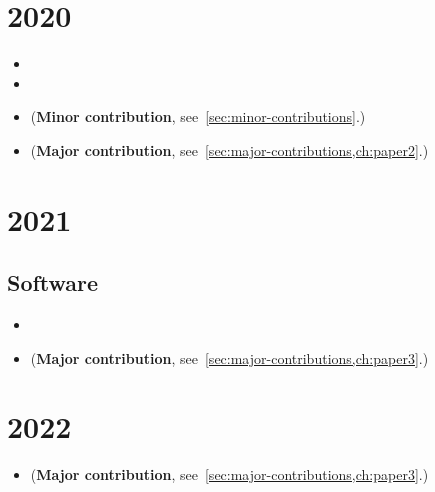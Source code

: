 \section*{2020}
\begin{itemize}
	\item {}
	\item {}
	\item {} (\textbf{Minor contribution}, see~\cref{sec:minor-contributions}.)
	\item {} (\textbf{Major contribution}, see~\cref{sec:major-contributions,ch:paper2}.)
\end{itemize}

\section*{2021}
\subsection*{Software}
\begin{itemize}
	\item {}
	\item {} (\textbf{Major contribution}, see~\cref{sec:major-contributions,ch:paper3}.)
\end{itemize}

\section*{2022}
\begin{itemize}
	\item {} (\textbf{Major contribution}, see~\cref{sec:major-contributions,ch:paper3}.)
\end{itemize}

